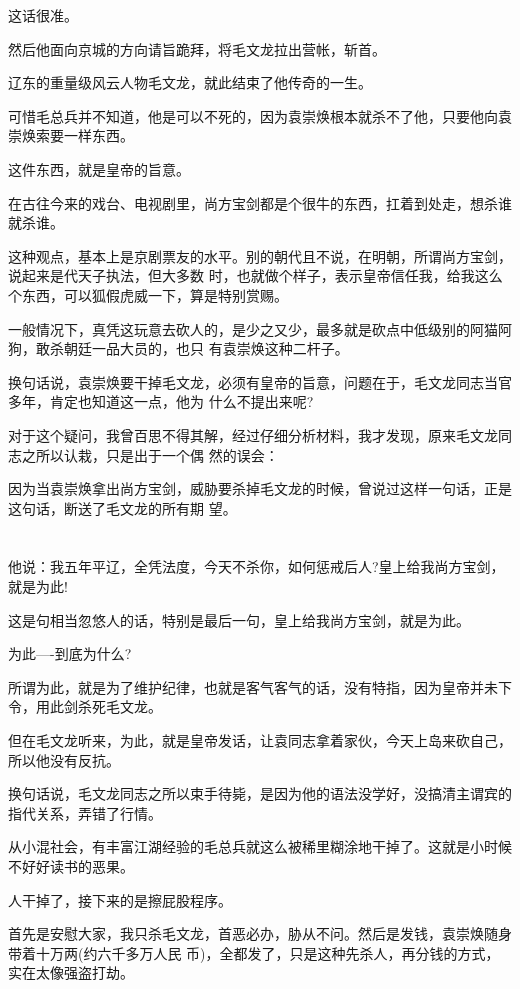 \documentclass[11pt,a4paper,onecolumn]{article}
\begin{document}
这话很准。

然后他面向京城的方向请旨跪拜，将毛文龙拉出营帐，斩首。

辽东的重量级风云人物毛文龙，就此结束了他传奇的一生。

可惜毛总兵并不知道，他是可以不死的，因为袁崇焕根本就杀不了他，只要他向袁崇焕索要一样东西。

这件东西，就是皇帝的旨意。

在古往今来的戏台、电视剧里，尚方宝剑都是个很牛的东西，扛着到处走，想杀谁就杀谁。

这种观点，基本上是京剧票友的水平。别的朝代且不说，在明朝，所谓尚方宝剑，说起来是代天子执法，但大多数
时，也就做个样子，表示皇帝信任我，给我这么个东西，可以狐假虎威一下，算是特别赏赐。

一般情况下，真凭这玩意去砍人的，是少之又少，最多就是砍点中低级别的阿猫阿狗，敢杀朝廷一品大员的，也只
有袁崇焕这种二杆子。

换句话说，袁崇焕要干掉毛文龙，必须有皇帝的旨意，问题在于，毛文龙同志当官多年，肯定也知道这一点，他为
什么不提出来呢?

对于这个疑问，我曾百思不得其解，经过仔细分析材料，我才发现，原来毛文龙同志之所以认栽，只是出于一个偶
然的误会：

因为当袁崇焕拿出尚方宝剑，威胁要杀掉毛文龙的时候，曾说过这样一句话，正是这句话，断送了毛文龙的所有期
望。

\section[\thesection]{}

他说：我五年平辽，全凭法度，今天不杀你，如何惩戒后人?皇上给我尚方宝剑，就是为此!

这是句相当忽悠人的话，特别是最后一句，皇上给我尚方宝剑，就是为此。

为此----到底为什么?

所谓为此，就是为了维护纪律，也就是客气客气的话，没有特指，因为皇帝并未下令，用此剑杀死毛文龙。

但在毛文龙听来，为此，就是皇帝发话，让袁同志拿着家伙，今天上岛来砍自己，所以他没有反抗。

换句话说，毛文龙同志之所以束手待毙，是因为他的语法没学好，没搞清主谓宾的指代关系，弄错了行情。

从小混社会，有丰富江湖经验的毛总兵就这么被稀里糊涂地干掉了。这就是小时候不好好读书的恶果。

人干掉了，接下来的是擦屁股程序。

首先是安慰大家，我只杀毛文龙，首恶必办，胁从不问。然后是发钱，袁崇焕随身带着十万两(约六千多万人民
币)，全都发了，只是这种先杀人，再分钱的方式，实在太像强盗打劫。
\end{document}
